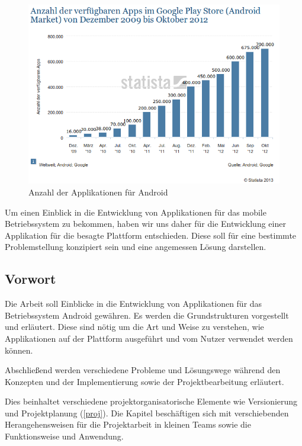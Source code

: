 \begin{figure}[h!t]
\begin{center}
\includegraphics[scale=0.6]{images/androidmarket}
\caption{Anzahl der Applikationen für Android}
\label{androidmarket}
\end{center}
\end{figure}

Um einen Einblick in die Entwicklung von Applikationen für das mobile Betriebssystem zu bekommen, haben wir uns daher für die Entwicklung einer Applikation für die besagte Plattform entschieden. Diese soll für eine bestimmte Problemstellung konzipiert sein und eine angemessen Lösung darstellen.

\subsection{Vorwort}

Die Arbeit soll Einblicke in die Entwicklung von Applikationen für das Betriebssystem Android gewähren. Es werden die Grundstrukturen vorgestellt und erläutert. Diese sind nötig um die Art und Weise zu verstehen, wie Applikationen auf der Plattform ausgeführt und vom Nutzer verwendet werden können.

Abschließend werden verschiedene Probleme und Lösungswege während den Konzepten und der Implementierung sowie der Projektbearbeitung erläutert.

Dies beinhaltet verschiedene projektorganisatorische Elemente wie Versionierung und Projektplanung (\ref{proj}). Die Kapitel beschäftigen sich mit verschiebenden Herangehensweisen für die Projektarbeit in kleinen Teams sowie die Funktionsweise und Anwendung.

